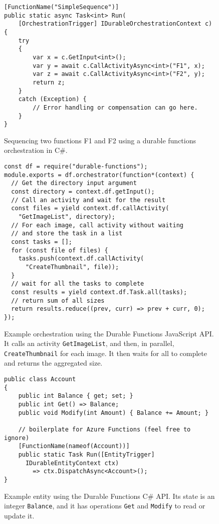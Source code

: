 \begin{figure}
\begin{verbatim}
[FunctionName("SimpleSequence")]
public static async Task<int> Run(
    [OrchestrationTrigger] IDurableOrchestrationContext c)
{
    try
    {
        var x = c.GetInput<int>();
        var y = await c.CallActivityAsync<int>("F1", x);
        var z = await c.CallActivityAsync<int>("F2", y);
        return z;
    }
    catch (Exception) {
        // Error handling or compensation can go here.
    }
}
\end{verbatim}
    \caption{Sequencing two functions F1 and F2 using a durable functions orchestration in C\#.}
    \label{fig:simplesequence}
\end{figure}
    
\begin{figure}
\begin{verbatim}
const df = require("durable-functions");
module.exports = df.orchestrator(function*(context) {
  // Get the directory input argument
  const directory = context.df.getInput();
  // Call an activity and wait for the result
  const files = yield context.df.callActivity(
    "GetImageList", directory);
  // For each image, call activity without waiting
  // and store the task in a list
  const tasks = [];
  for (const file of files) {
    tasks.push(context.df.callActivity(
      "CreateThumbnail", file));
  }
  // wait for all the tasks to complete
  const results = yield context.df.Task.all(tasks);
  // return sum of all sizes
  return results.reduce((prev, curr) => prev + curr, 0);
});
\end{verbatim}
\caption{Example orchestration using the Durable Functions JavaScript API. It calls
an activity \texttt{GetImageList}, and then, in parallel, \texttt{CreateThumbnail} for each image. It then waits for all to complete and returns the aggregated size.}
\label{fig:orchestration}
\end{figure}


\begin{figure}
\begin{verbatim}
public class Account
{
    public int Balance { get; set; }
    public int Get() => Balance;
    public void Modify(int Amount) { Balance += Amount; }

    // boilerplate for Azure Functions (feel free to ignore)
    [FunctionName(nameof(Account))]
    public static Task Run([EntityTrigger] 
      IDurableEntityContext ctx)
        => ctx.DispatchAsync<Account>();
}
\end{verbatim}
\caption{Example entity using the Durable Functions C\# API. Its state 
is an integer \texttt{Balance}, and
it has operations \texttt{Get} and \texttt{Modify} to read or update it.}
\label{fig:entity}
\end{figure}

